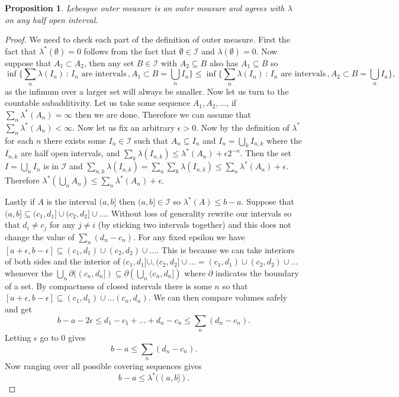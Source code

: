 \documentclass[11pt]{article}
\newtheorem{prp}[thm]{Proposition}
\theoremstyle{definition}
\theoremstyle{remark}
\begin{document}
\begin{prp}
Lebesgue outer measure is an outer measure and agrees with $\lambda$ on any half open interval.
\end{prp}
\begin{proof}
We need to check each part of the definition of outer measure. First the fact that $\lambda^*(\emptyset) = 0$ follows from the fact that $\emptyset \in \mathcal{I}$ and $\lambda(\emptyset) = 0$. Now suppose that $A_1 \subset A_2$, then any set $B \in \mathcal{I}$ with $A_2 \subseteq B$ also has $A_1 \subseteq B$ so 
\[ \inf \{ \sum_n\lambda (I_n) \, : \, \mbox{$I_n$ are intervals}\,, A_1 \subset B = \bigcup_n I_n\} \leq \inf \{ \sum_n\lambda (I_n) \, : \, \mbox{$I_n$ are intervals}\,, A_2 \subset B = \bigcup_n I_n\}, \] as the infimum over a larger set will always be smaller. Now let us turn to the countable subadditivity. Let us take some sequence $A_1, A_2, \dots$, if $\sum_n \lambda^*(A_n) = \infty$ then we are done. Therefore we can assume that $\sum_n \lambda^*(A_n) < \infty$. Now let us fix an arbitrary $\epsilon>0$. Now by the definition of $\lambda^*$ for each $n$ there exists some $I_n \in \mathcal{I}$ such that $A_n \subseteq I_n$ and $I_n = \bigcup_k I_{n,k}$ where the $I_{n,k}$ are half open intervals, and $\sum_k\lambda(I_{n,k}) \leq \lambda^* (A_n) + \epsilon 2^{-n}$. Then the set $I = \bigcup_n I_n$ is in $\mathcal{I}$ and $\sum_{n,k}\lambda(I_{n,k}) = \sum_n \sum_k\lambda(I_{n,k}) \leq \sum_n \lambda^*(A_n) + \epsilon$. Therefore $\lambda^*(\bigcup_n A_n) \leq  \sum_n \lambda^*(A_n) + \epsilon$.

Lastly if $A$ is the interval $(a,b]$ then $(a,b] \in \mathcal{I}$ so $\lambda^*(A) \leq b-a$. Suppose that $(a,b] \subseteq (c_1,d_1] \cup (c_2, d_2] \cup \dots$. Without loss of generality rewrite our intervals so that $d_i \neq c_j$ for any $j \neq i$ (by sticking two intervals together) and this does not change the value of $\sum_n (d_n - c_n)$. For any fixed epsilon we have $[a+\epsilon,b-\epsilon] \subseteq (c_1,d_1) \cup (c_2,d_2) \cup \dots$. This is because we can take interiors of both sides and the interior of $(c_1, d_1] \cup, (c_2, d_2] \cup \dots = (c_1,d_1) \cup (c_2, d_2) \cup \dots$ whenever the $\bigcup_n \partial ((c_n, d_n]) \subseteq \partial \left( \bigcup_n (c_n,d_n]\right)$ where $\partial$ indicates the boundary of a set. By compactness of closed intervals there is some $n$ so that $[a+\epsilon, b- \epsilon] \subseteq (c_1,d_1) \cup \dots (c_n, d_n)$. We can then compare volumes safely and get
\[ b-a -2\epsilon \leq d_1-c_1 + \dots + d_n -c_n \leq \sum_n (d_n - c_n). \] Letting $\epsilon$ go to $0$ gives
\[ b-a \leq \sum_n (d_n-c_n). \] Now ranging over all possible covering sequences gives
\[ b-a \leq \lambda^*((a,b]). \]


\end{proof}
\end{document}
